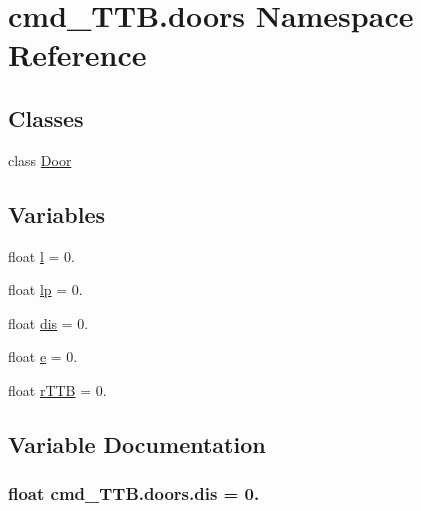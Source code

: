 \hypertarget{namespacecmd__TTB_1_1doors}{}\section{cmd\+\_\+\+T\+T\+B.\+doors Namespace Reference}
\label{namespacecmd__TTB_1_1doors}
\subsection*{Classes}
\begin{DoxyCompactItemize}
\item 
class \hyperlink{classcmd__TTB_1_1doors_1_1Door}{Door}
\end{DoxyCompactItemize}
\subsection*{Variables}
\begin{DoxyCompactItemize}
\item 
float \hyperlink{namespacecmd__TTB_1_1doors_a7edc9274a9a0b6615f96a8e17f0b0277}{l} = 0.
\item 
float \hyperlink{namespacecmd__TTB_1_1doors_a8e066184a3489232b92a2eca6cfe55fa}{lp} = 0.
\item 
float \hyperlink{namespacecmd__TTB_1_1doors_ac30e64885af444116fe3e6b069dc795d}{dis} = 0.
\item 
float \hyperlink{namespacecmd__TTB_1_1doors_a99b15da7b509ca67430f4a75c9a7e4e0}{e} = 0.
\item 
float \hyperlink{namespacecmd__TTB_1_1doors_ae8c336892ae92db43343a7bc01611de6}{r\+T\+TB} = 0.
\end{DoxyCompactItemize}


\subsection{Variable Documentation}
\subsubsection[{\texorpdfstring{dis}{dis}}]{\setlength{\rightskip}{0pt plus 5cm}float cmd\+\_\+\+T\+T\+B.\+doors.\+dis = 0.}\hypertarget{namespacecmd__TTB_1_1doors_ac30e64885af444116fe3e6b069dc795d}{}\label{namespacecmd__TTB_1_1doors_ac30e64885af444116fe3e6b069dc795d}
